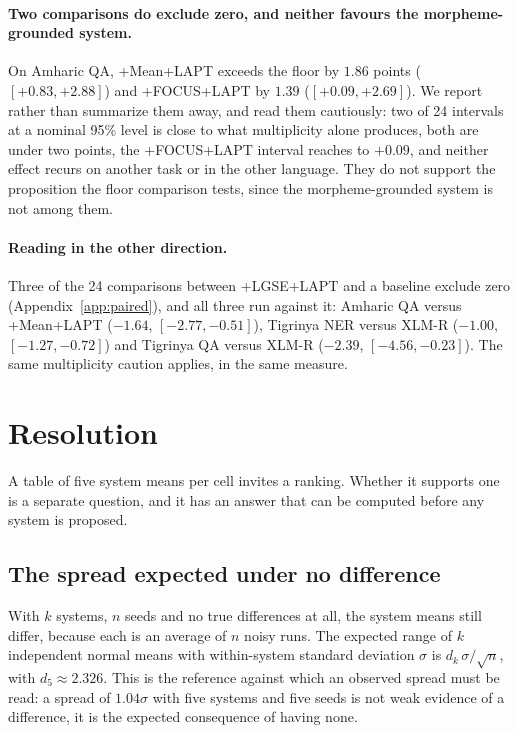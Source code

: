 \documentclass[11pt]{article}
\begin{document}
\paragraph{Two comparisons do exclude zero, and neither favours the
morpheme-grounded system.} On Amharic QA, +Mean+LAPT exceeds the floor by
$1.86$ points ($[+0.83,+2.88]$) and +FOCUS+LAPT by $1.39$
($[+0.09,+2.69]$). We report rather than summarize them away, and read them
cautiously: two of 24 intervals at a nominal 95\% level is close to what
multiplicity alone produces, both are under two points, the +FOCUS+LAPT
interval reaches to $+0.09$, and neither effect recurs on another task or in
the other language. They do not support the proposition the floor comparison
tests, since the morpheme-grounded system is not among them.

\paragraph{Reading in the other direction.} Three of the 24 comparisons
between +LGSE+LAPT and a baseline exclude zero (Appendix~\ref{app:paired}),
and all three run against it: Amharic QA versus +Mean+LAPT ($-1.64$,
$[-2.77,-0.51]$), Tigrinya NER versus XLM-R ($-1.00$, $[-1.27,-0.72]$) and
Tigrinya QA versus XLM-R ($-2.39$, $[-4.56,-0.23]$). The same multiplicity
caution applies, in the same measure.

\section{Resolution}
\label{sec:resolution}

A table of five system means per cell invites a ranking. Whether it supports
one is a separate question, and it has an answer that can be computed before
any system is proposed.

\subsection{The spread expected under no difference}

With $k$ systems, $n$ seeds and no true differences at all, the system means
still differ, because each is an average of $n$ noisy runs. The expected
range of $k$ independent normal means with within-system standard deviation
$\sigma$ is $d_k\,\sigma/\sqrt{n}$, with $d_5 \approx 2.326$. This is the
reference against which an observed spread must be read: a spread of
$1.04\sigma$ with five systems and five seeds is not weak evidence of a
difference, it is the expected consequence of having none.
\end{document}
